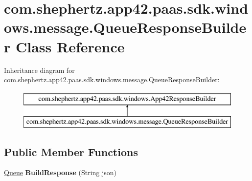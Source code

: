 \hypertarget{classcom_1_1shephertz_1_1app42_1_1paas_1_1sdk_1_1windows_1_1message_1_1_queue_response_builder}{\section{com.\+shephertz.\+app42.\+paas.\+sdk.\+windows.\+message.\+Queue\+Response\+Builder Class Reference}
\label{classcom_1_1shephertz_1_1app42_1_1paas_1_1sdk_1_1windows_1_1message_1_1_queue_response_builder}
}
Inheritance diagram for com.\+shephertz.\+app42.\+paas.\+sdk.\+windows.\+message.\+Queue\+Response\+Builder\+:\begin{figure}[H]
\begin{center}
\leavevmode
\includegraphics[height=2.000000cm]{classcom_1_1shephertz_1_1app42_1_1paas_1_1sdk_1_1windows_1_1message_1_1_queue_response_builder}
\end{center}
\end{figure}
\subsection*{Public Member Functions}
\begin{DoxyCompactItemize}
\item 
\hypertarget{classcom_1_1shephertz_1_1app42_1_1paas_1_1sdk_1_1windows_1_1message_1_1_queue_response_builder_a2e504d950859632d9d14dfbcc0ee4fe0}{\hyperlink{classcom_1_1shephertz_1_1app42_1_1paas_1_1sdk_1_1windows_1_1message_1_1_queue}{Queue} {\bfseries Build\+Response} (String json)}\label{classcom_1_1shephertz_1_1app42_1_1paas_1_1sdk_1_1windows_1_1message_1_1_queue_response_builder_a2e504d950859632d9d14dfbcc0ee4fe0}

\end{DoxyCompactItemize}
